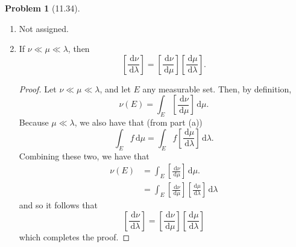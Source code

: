 \documentclass[12pt]{article}
\newcommand{\dif}{\, \mathrm{d}}
\theoremstyle{definition}
\newtheorem{problem}{Problem}
\begin{document}
\begin{problem}[11.34]
\begin{enumerate}[label = \alph{*}.]
\begin{proof}
\begin{align*}
                            &= \int_{E} f \left[ \frac{\dif \nu}{\dif \mu} \right] \dif \mu.
                        \end{align*}
                Having exhausted all cases, this completes the proof. 
                \end{proof}
        \item  Not assigned.
        \item If \( \nu \ll \mu \ll \lambda \), then
            \[
                \left[ \frac{\dif \nu}{\dif \lambda} \right] = \left[ \frac{\dif \nu}{\dif \mu} \right] \left[ \frac{\dif \mu}{\dif \lambda} \right]. 
            \]
                \begin{proof}
                    Let \( \nu \ll \mu \ll \lambda \), and let \( E \) any measurable set.
                    Then, by definition, 
                        \[
                            \nu(E) = \int_{E} \left[ \frac{\dif \nu}{\dif \mu} \right] \dif \mu. 
                        \]
                    Because \( \mu \ll \lambda \), we also have that (from part (a))
                        \[
                            \int_{E} f \dif \mu = \int_{E} f \left[ \frac{\dif \mu}{\dif \lambda} \right] \dif \lambda.  
                        \]
                    Combining these two, we have that
                        \begin{align*}
                            \nu(E) &= \int_{E} \left[ \frac{\dif \nu}{\dif \mu} \right] \dif \mu.  \\
                            &= \int_{E} \left[ \frac{\dif \nu}{\dif \mu} \right] \left[ \frac{\dif \mu}{\dif \lambda} \right] \dif \lambda
                        \end{align*}
                    and so it follows that
                        \[
                            \left[ \frac{\dif \nu}{\dif \lambda} \right] = \left[ \frac{\dif \nu}{\dif \mu} \right] \left[ \frac{\dif \mu}{\dif \lambda} \right]
                        \]
                    which completes the proof. 
                \end{proof}
    \end{enumerate}
    
\end{problem}
\end{document}
